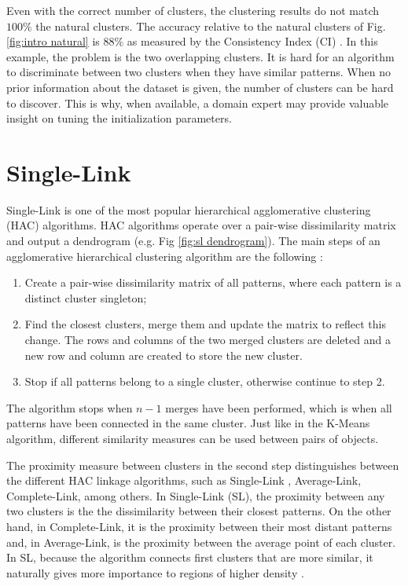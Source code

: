 Even with the correct number of clusters, the clustering results do not match $100\%$ the natural clusters.
The accuracy relative to the natural clusters of Fig. \ref{fig:intro natural} is $88\%$ as measured by the Consistency Index (CI) \cite{Fred2001}.
In this example, the problem is the two overlapping clusters.
It is hard for an algorithm to discriminate between two clusters when they have similar patterns.
When no prior information about the dataset is given, the number of clusters can be hard to discover.
This is why, when available, a domain expert may provide valuable insight on tuning the initialization parameters.

\section{Single-Link}
\label{sec:sl}

Single-Link \cite{sneath1962numerical} is one of the most popular hierarchical agglomerative clustering (HAC) algorithms.
HAC algorithms operate over a pair-wise dissimilarity matrix and output a dendrogram (e.g. Fig \ref{fig:sl dendrogram}).
The main steps of an agglomerative hierarchical clustering algorithm are the following \cite{Jain1999}:
\begin{enumerate}
    \item Create a pair-wise dissimilarity matrix of all patterns, where each pattern is a distinct cluster singleton;

    \item Find the closest clusters, merge them and update the matrix to reflect this change. The rows and columns of the two merged clusters are deleted and a new row and column are created to store the new cluster.%

    \item Stop if all patterns belong to a single cluster, otherwise continue to step 2.
\end{enumerate}

The algorithm stops when $n-1$ merges have been performed, which is when all patterns have been connected in the same cluster.
Just like in the K-Means algorithm, different similarity measures can be used between pairs of objects.

The proximity measure between clusters in the second step distinguishes between the different HAC linkage algorithms, such as Single-Link , Average-Link, Complete-Link, among others.
In Single-Link (SL), the proximity between any two clusters is the the dissimilarity between their closest patterns.
On the other hand, in Complete-Link, it is the proximity between their most distant patterns and, in Average-Link, is the proximity between the average point of each cluster.
In SL, because the algorithm connects first clusters that are more similar, it naturally gives more importance to regions of higher density \cite{Aggarwal2014}.

